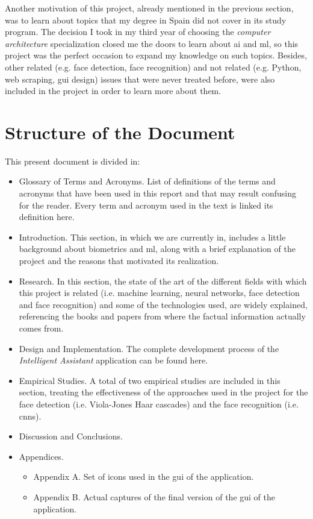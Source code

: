 Another motivation of this project, already mentioned in the previous section, was to learn about topics that my degree in Spain did not cover in its study program. The decision I took in my third year of choosing the \textit{computer architecture} specialization closed me the doors to learn about \gls{ai} and \gls{ml}, so this project was the perfect occasion to expand my knowledge on such topics. Besides, other related (e.g. face detection, face recognition) and not related (e.g. Python, web \gls{scraping}, \gls{gui} design) issues that were never treated before, were also included in the project in order to learn more about them. 

\section{Structure of the Document}
This present document is divided in:

\begin{itemize}
	\item Glossary of Terms and Acronyms. List of definitions of the terms and acronyms that have been used in this report and that may result confusing for the reader. Every term and acronym used in the text is linked its definition here.
	\item Introduction. This section, in which we are currently in, includes a little background about biometrics and \gls{ml}, along with a brief explanation of the project and the reasons that motivated its realization.  
	\item Research. In this section, the state of the art of the different fields with which this project is related (i.e. machine learning, neural networks, face detection and face recognition) and some of the technologies used, are widely explained, referencing the books and papers from where the factual information actually comes from. 
	\item Design and Implementation. The complete development process of the \textit{Intelligent Assistant} application can be found here.
	\item Empirical Studies. A total of two empirical studies are included in this section, treating the effectiveness of the approaches used in the project for the face detection (i.e. Viola-Jones Haar cascades) and the face recognition (i.e. \glspl{cnn}).
	\item Discussion and Conclusions.
	\item Appendices. 
	\begin{itemize}
		\item Appendix A. Set of icons used in the \gls{gui} of the application.
		\item Appendix B. Actual captures of the final version of the \gls{gui} of the application.
	\end{itemize}
\end{itemize}



